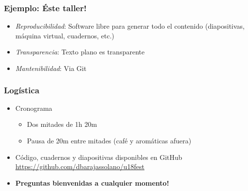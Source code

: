 \documentclass[xcolor=dvipsnames,10pt]{beamer}
\begin{document}
%
\begin{frame}
  \frametitle{Ejemplo: Éste taller!}
  \begin{itemize}
  \item \emph{Reproducibilidad}: Software libre para generar todo el contenido (diapositivas, máquina virtual, cuadernos, etc.)
  \item \emph{Transparencia}: Texto plano es transparente
  \item \emph{Mantenibilidad}: Via \textsf{Git}
  \end{itemize}
\end{frame}
%
\begin{frame}
  \frametitle{Logística}
  \begin{itemize}
  \item Cronograma
    \begin{itemize}
    \item Dos mitades de 1h 20m
    \item Pausa de 20m entre mitades (café y aromáticas afuera)
    \end{itemize}
  \item Código, cuadernos y diapositivas disponibles en \textsf{GitHub}\\
    \url{https://github.com/dbarajassolano/u18fest}
  \item \textbf{Preguntas bienvenidas a cualquier momento!}
  \end{itemize}
\end{frame}
\end{document}
